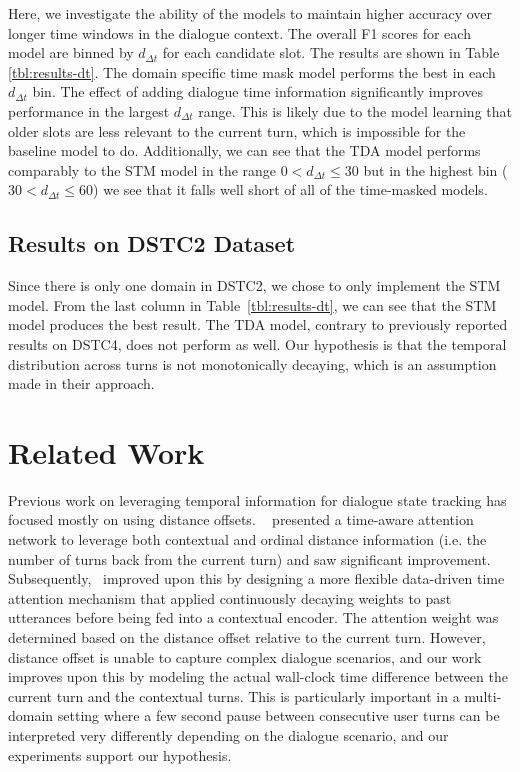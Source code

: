 \documentclass[11pt,a4paper]{article}
\begin{document}
Here, we investigate the ability of the models to maintain higher accuracy over longer time windows in the dialogue context.
The overall F1 scores for each model are binned by $d_{\Delta t}$ for each candidate slot.
The results are shown in Table \ref{tbl:results-dt}.
The domain specific time mask model performs the best in each $d_{\Delta t}$ bin.
The effect of adding dialogue time information significantly improves performance in the largest $d_{\Delta t}$ range.
This is likely due to the model learning that older slots are less relevant to the current turn, which is impossible for the baseline model to do.
Additionally, we can see that the TDA model performs comparably to the STM model in the range $0 < d_{\Delta t} \leq 30$ but in the highest bin ($30 < d_{\Delta t} \leq 60$) we see that it falls well short of all of the time-masked models.

\subsection{Results on DSTC2 Dataset}

Since there is only one domain in DSTC2, we chose to only implement the STM model.
From the last column in Table~\ref{tbl:results-dt}, we can see that the STM model produces the best result.
The TDA model, contrary to previously reported results on DSTC4, does not perform as well.
Our hypothesis is that the temporal distribution across turns is not monotonically decaying, which is an assumption made in their approach.
 
\section{Related Work}
\label{sec:related}
Previous work on leveraging temporal information for dialogue state tracking has focused mostly on using distance offsets.
~\cite{chen2017dynamic} presented a time-aware attention network to leverage both contextual and ordinal distance information (i.e. the number of turns back from the current turn) and saw significant improvement.
Subsequently,~\cite{su2018time} improved upon this by designing a more flexible data-driven time attention mechanism that applied continuously decaying weights to past utterances before being fed into a contextual encoder.
The attention weight was determined based on the distance offset relative to the current turn.
However, distance offset is unable to capture complex dialogue scenarios, and our work improves upon this by modeling the actual wall-clock time difference between the current turn and the contextual turns.
This is particularly important in a multi-domain setting where a few second pause between consecutive user turns can be interpreted very differently depending on the dialogue scenario, and our experiments support our hypothesis.
\end{document}
